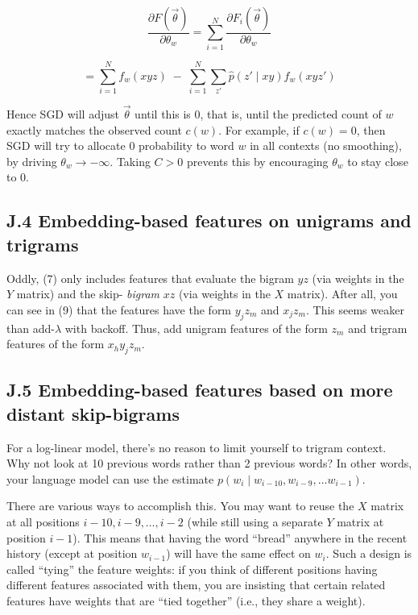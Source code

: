 \[
\frac{\partial F(\vec{\theta})}{\partial \theta_w} = \sum_{i=1}^N \frac{\partial F_i(\vec{\theta})}{\partial \theta_w} \tag{28}
\]

\[
= \sum_{i=1}^N f_w(xyz) \;-\; \sum_{i=1}^N \sum_{z'} \hat{p}(z' \mid xy) f_w(xyz') \tag{29}
\]

Hence SGD will adjust $\vec{\theta}$ until this is 0, that is, until the predicted count of $w$ exactly matches the observed 
count $c(w)$. For example, if $c(w) = 0$, then SGD will try to allocate 0 probability to word $w$ in all contexts 
(no smoothing), by driving $\theta_w \to -\infty$. Taking $C > 0$ prevents this by encouraging $\theta_w$ to stay close to 0. 

\subsection*{J.4 Embedding-based features on unigrams and trigrams}

Oddly, (7) only includes features that evaluate the bigram $yz$ (via weights in the $Y$ matrix) and the skip-
\emph{bigram} $xz$ (via weights in the $X$ matrix). After all, you can see in (9) that the features have the form $y_j z_m$ 
and $x_j z_m$. This seems weaker than add-$\lambda$ with backoff. Thus, add unigram features of the form $z_m$ and 
trigram features of the form $x_h y_j z_m$. 

\subsection*{J.5 Embedding-based features based on more distant skip-bigrams}

For a log-linear model, there’s no reason to limit yourself to trigram context. Why not look at 10 previous 
words rather than 2 previous words? In other words, your language model can use the estimate $p(w_i \mid w_{i-10}, w_{i-9}, \ldots w_{i-1})$. 

There are various ways to accomplish this. You may want to reuse the $X$ matrix at all positions $i-10, i-9, \ldots, i-2$ (while still using a separate $Y$ matrix at position $i-1$). This means that having the 
word “bread” anywhere in the recent history (except at position $w_{i-1}$) will have the same effect on $w_i$. Such 
a design is called “tying” the feature weights: if you think of different positions having different features 
associated with them, you are insisting that certain related features have weights that are “tied together” 
(i.e., they share a weight). 

